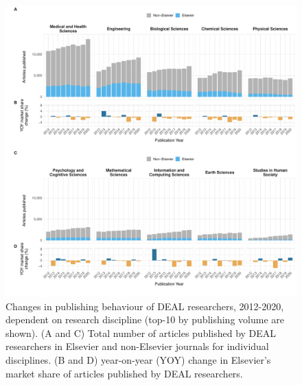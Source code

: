 \documentclass[
]{article}
\begin{document}
\begin{figure}

{\centering \includegraphics{analysis_files/figure-latex/items-publisher-year-category-1} 

}

\caption{Changes in publishing behaviour of DEAL researchers, 2012-2020, dependent on research discipline (top-10 by publishing volume are shown). (A and C) Total number of articles published by DEAL researchers in Elsevier and non-Elsevier journals for individual disciplines. (B and D) year-on-year (YOY) change in Elsevier's market share of articles published by DEAL researchers.}\label{fig:items-publisher-year-category}
\end{figure}
\end{document}
